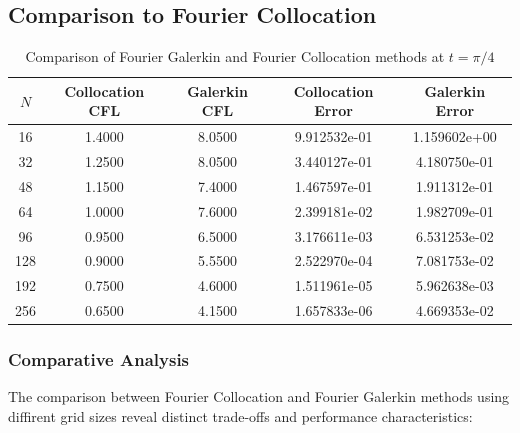 \subsection{Comparison to Fourier Collocation}

\begin{table}[h]
	\centering
	\begin{tabular}{|c|c|c|c|c|}
		\hline
		$N$ & Collocation CFL & Galerkin CFL & Collocation Error & Galerkin Error \\
		\hline
		16  & 1.4000          & 8.0500       & 9.912532e-01      & 1.159602e+00   \\
		32  & 1.2500          & 8.0500       & 3.440127e-01      & 4.180750e-01   \\
		48  & 1.1500          & 7.4000       & 1.467597e-01      & 1.911312e-01   \\
		64  & 1.0000          & 7.6000       & 2.399181e-02      & 1.982709e-01   \\
		96  & 0.9500          & 6.5000       & 3.176611e-03      & 6.531253e-02   \\
		128 & 0.9000          & 5.5500       & 2.522970e-04      & 7.081753e-02   \\
		192 & 0.7500          & 4.6000       & 1.511961e-05      & 5.962638e-03   \\
		256 & 0.6500          & 4.1500       & 1.657833e-06      & 4.669353e-02   \\
		\hline
	\end{tabular}
	\caption{Comparison of Fourier Galerkin and Fourier Collocation methods at $t = \pi/4$}
	\label{tab:comparison}
\end{table}

\subsubsection{Comparative Analysis}
The comparison between Fourier Collocation and Fourier Galerkin methods using diffirent grid sizes reveal distinct trade-offs and performance characteristics:

